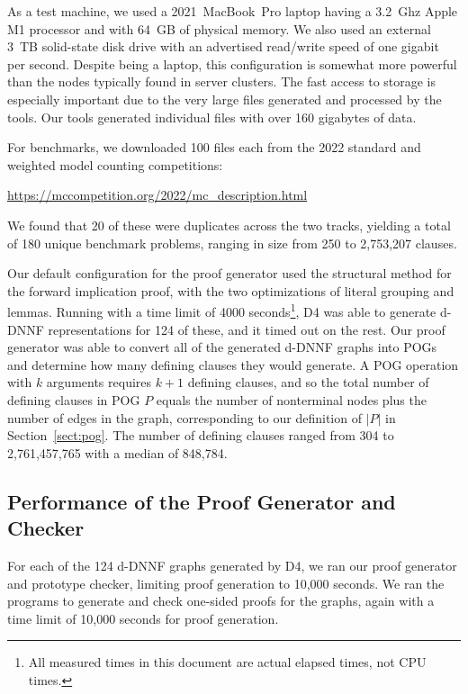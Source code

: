 \documentclass[letterpaper,USenglish,cleveref, autoref, thm-restate]{lipics-v2021}
\newcommand{\progname}[1]{\textsc{#1}}
\newcommand{\dfour}{\progname{D4}}
\begin{document}
As a test machine, we used a 2021~MacBook~Pro laptop having a 3.2~Ghz
Apple M1 processor and with 64~GB of physical memory.  We also used an
external 3~TB solid-state disk drive with an advertised read/write
speed of one gigabit per second.  Despite being a laptop, this
configuration is somewhat more powerful than the nodes typically
found in server clusters.  The fast access to storage is especially
important due to the very large files generated and processed by the
tools.  Our tools generated individual files with over 160 gigabytes
of data.

For benchmarks, we downloaded 100 files each from the 2022 standard and weighted model counting competitions:
\begin{center}
       \url{https://mccompetition.org/2022/mc_description.html}
\end{center}
We found that 20 of these were duplicates across the two tracks,
yielding a total of 180 unique benchmark problems, ranging in size
from 250 to 2,753,207 clauses.

Our default configuration for the proof generator used the structural
method for the forward implication proof, with the two optimizations
of literal grouping and lemmas.
Running with a time limit of 4000 seconds\footnote{All measured times
in this document are actual elapsed times, not CPU times.}, \dfour{}
was able to generate d-DNNF representations for 124 of these, and it timed out on the
rest.  Our proof generator was able to convert all of the generated
d-DNNF graphs into POGs and determine how many defining clauses they
would generate.  A POG operation with $k$ arguments requires $k+1$
defining clauses, and so the total number of defining clauses in POG $P$ equals
the number of nonterminal nodes plus the number of edges in the graph, corresponding to our definition of $|P|$ in Section~\ref{sect:pog}.
The number of defining clauses ranged from 304 to 2,761,457,765 with a median of 848,784.

\subsection{Performance of the Proof Generator and Checker}



For each of the 124 d-DNNF graphs generated by \dfour{}, we ran
our proof generator and prototype checker, limiting proof
generation to 10,000 seconds.  We ran the programs to generate and check
one-sided proofs for the graphs, again with a time limit of 10,000
seconds for proof generation.
\end{document}
